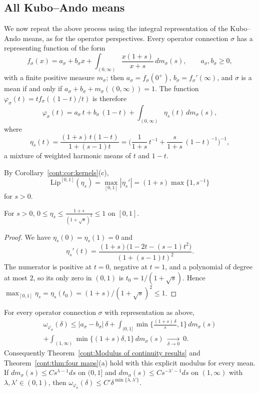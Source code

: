 \subsection{All Kubo--Ando means}
 We now repeat the above process using the integral representation of the Kubo--Ando means, as for the operator perspectives.
Every operator connection $\sigma$ has a representing function of the form \cite{KuboAndo1980}
\[
f_\sigma(x)=a_\sigma+b_\sigma x+\int_{(0,\infty)}\frac{x(1+s)}{x+s}\,dm_\sigma(s),\qquad a_\sigma,b_\sigma\geq0,
\]
with a finite positive measure $m_\sigma$; then $a_\sigma=f_\sigma(0^+)$, $b_\sigma=f_\sigma'(\infty)$, and $\sigma$ is a mean if and only if $a_\sigma+b_\sigma+m_\sigma((0,\infty))=1$. The function $\varphi_\sigma(t)=tf_\sigma((1-t)/t)$  is therefore
\begin{equation}\label{cont:eq:mean kernels}
\varphi_\sigma(t)=a_\sigma\,t+b_\sigma\,(1-t)+\int_{(0,\infty)}\eta_s(t)\,dm_\sigma(s),
\end{equation}
where
\[
\eta_s(t)=\frac{(1+s)\,t(1-t)}{1+(s-1)t}=\Big(\frac{1}{1+s}\,t^{-1}+\frac{s}{1+s}\,(1-t)^{-1}\Big)^{-1},
\]
a mixture of weighted harmonic means of $t$ and $1-t$.
 
By Corollary~\ref{cont:cor:kernels}(c),
\[
\mathrm{Lip}^{[0,1]}(\eta_s)=\max_{[0,1]}|\eta_s'|=(1+s)\max\{1,s^{-1}\}
\]
for $s>0$.

\begin{lemma}\label{cont:lem:harmonic kernels}
For $s>0$, $0\leq\eta_s\leq\frac{1+s}{(1+\sqrt s)^2}\leq1$ on $[0,1]$.
\end{lemma}
 
\begin{proof}
We have $\eta_s(0)=\eta_s(1)=0$ and
\[
\eta_s'(t)=\frac{(1+s)\big(1-2t-(s-1)t^2\big)}{(1+(s-1)t)^2}.
\]
The numerator is positive at $t=0$, negative at $t=1$, and a polynomial of degree at most $2$, so its only zero in $(0,1)$ is $t_0=1/(1+\sqrt s)$. Hence $\max_{[0,1]}\eta_s=\eta_s(t_0)=(1+s)/(1+\sqrt s)^2\leq1$.
\end{proof}
 
\begin{theorem}\label{cont:thm:means modulus}
For every operator connection $\sigma$ with representation as above,
\begin{multline*}%
\omega_{\varphi_\sigma}(\delta)\leq|a_\sigma-b_\sigma|\,\delta+\int_{(0,1]}\min\Big\{\frac{(1+s)\,\delta}{s},1\Big\}\,dm_\sigma(s)\\+\int_{(1,\infty)}\min\{(1+s)\delta,1\}\,dm_\sigma(s)\ \xrightarrow[\delta\to0]{}\ 0 .
\end{multline*}
Consequently Theorem~\ref{cont:Modulus of continuity results} and Theorem~\ref{cont:thm:four maps}(a) hold with this explicit modulus for every mean. If $dm_\sigma(s)\leq Cs^{\lambda-1}ds$ on $(0,1]$ and $dm_\sigma(s)\leq Cs^{-\lambda'-1}ds$ on $(1,\infty)$ with $\lambda,\lambda'\in(0,1)$, then $\omega_{\varphi_\sigma}(\delta)\leq C'\delta^{\min\{\lambda,\lambda'\}}$.
\end{theorem}
 
